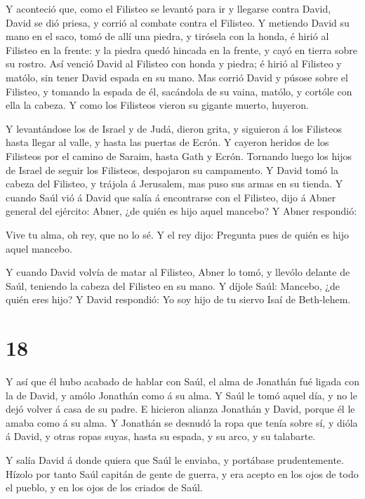  Y aconteció que, como el Filisteo se levantó para ir y
llegarse contra David, David se dió priesa, y corrió al combate contra
el Filisteo.  Y metiendo David su mano en el saco, tomó de
allí una piedra, y tirósela con la honda, é hirió al Filisteo en la
frente: y la piedra quedó hincada en la frente, y cayó en tierra sobre
su rostro.  Así venció David al Filisteo con honda y
piedra; é hirió al Filisteo y matólo, sin tener David espada en su mano.
 Mas corrió David y púsose sobre el Filisteo, y tomando la
espada de él, sacándola de su vaina, matólo, y cortóle con ella la
cabeza. Y como los Filisteos vieron su gigante muerto, huyeron.

 Y levantándose los de Israel y de Judá, dieron grita, y
siguieron á los Filisteos hasta llegar al valle, y hasta las puertas de
Ecrón. Y cayeron heridos de los Filisteos por el camino de Saraim, hasta
Gath y Ecrón.  Tornando luego los hijos de Israel de seguir
los Filisteos, despojaron su campamento.  Y David tomó la
cabeza del Filisteo, y trájola á Jerusalem, mas puso sus armas en su
tienda.  Y cuando Saúl vió á David que salía á encontrarse
con el Filisteo, dijo á Abner general del ejército: Abner, ¿de quién es
hijo aquel mancebo? Y Abner respondió:

 Vive tu alma, oh rey, que no lo sé. Y el rey dijo:
Pregunta pues de quién es hijo aquel mancebo.

 Y cuando David volvía de matar al Filisteo, Abner lo tomó,
y llevólo delante de Saúl, teniendo la cabeza del Filisteo en su mano.
 Y díjole Saúl: Mancebo, ¿de quién eres hijo? Y David
respondió: Yo soy hijo de tu siervo Isaí de Beth-lehem.

\hypertarget{section-17}{%
\section{18}\label{section-17}}

 Y así que él hubo acabado de hablar con Saúl, el alma de
Jonathán fué ligada con la de David, y amólo Jonathán como á su alma.
 Y Saúl le tomó aquel día, y no le dejó volver á casa de su
padre.  E hicieron alianza Jonathán y David, porque él le
amaba como á su alma.  Y Jonathán se desnudó la ropa que
tenía sobre sí, y dióla á David, y otras ropas suyas, hasta su espada, y
su arco, y su talabarte.

 Y salía David á donde quiera que Saúl le enviaba, y
portábase prudentemente. Hízolo por tanto Saúl capitán de gente de
guerra, y era acepto en los ojos de todo el pueblo, y en los ojos de los
criados de Saúl.

